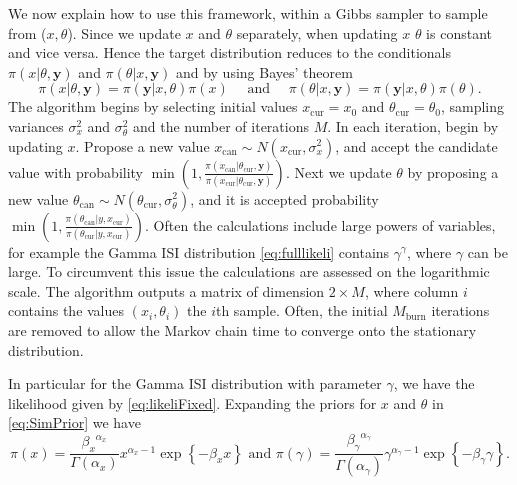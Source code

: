 \documentclass[../main.tex]{subfiles}
\begin{document}
 We now explain how to use this framework, within a Gibbs sampler to sample from ($x,\theta$). Since we update $x$ and $\theta$ separately, when updating $x$ $\theta$ is constant and vice versa. Hence the target distribution reduces to the conditionals $\pi(x | \theta, \mathbf{y})$ and $\pi(\theta | x, \mathbf{y})$  and by using Bayes' theorem
\begin{equation}
\pi(x | \theta, \mathbf{y}) = \pi(\mathbf{y}|x,\theta) \pi(x)   \quad \text{ and } \quad \pi(\theta | x, \mathbf{y}) = \pi(\mathbf{y}|x,\theta)
\pi(\theta). 
\end{equation}   
The algorithm begins by selecting initial values $x_{\mathrm{cur}} = x_0$ and $\theta_{\mathrm{cur}} = \theta_0$, sampling variances $\sigma^2_x$ and $\sigma^2_{\theta}$ and the number of iterations $M$. In each iteration, begin by updating $x$. Propose a new value $x_{\mathrm{can}} \sim N(x_{\mathrm{cur}}, \sigma^2_x)$, and accept the candidate value with probability $\min \left(1,\frac{\pi(x_{\mathrm{can}} |\theta_{\mathrm{cur}}, \mathbf{y})}{\pi(x_{\mathrm{cur}}|\theta_{\mathrm{cur}}, \mathbf{y})}\right)$. Next we update $\theta$ by proposing a new value $\theta_{\mathrm{can}} \sim N(\theta_{\mathrm{cur}}, \sigma^2_\theta)$, and it is accepted probability $\min \left(1,\frac{\pi(\theta_{\mathrm{can}} | y, x_{\mathrm{cur}})}{\pi(\theta_{\mathrm{cur}} | y, x_{\mathrm{cur}})}\right)$. Often the calculations include large powers of variables, for example the Gamma ISI distribution \eqref{eq:fulllikeli} contains $\gamma^\gamma$, where $\gamma$ can be large. To circumvent this issue the calculations are assessed on the logarithmic scale. The algorithm outputs a matrix of dimension $2 \times M$, where column $i$ contains the values $(x_i,\theta_i)$ the $i$th sample. Often, the initial $M_{\mathrm{burn}}$ iterations are removed to allow the Markov chain time to converge onto the stationary distribution.


In particular for the Gamma ISI distribution with parameter $\gamma$, we have the likelihood given by \eqref{eq:likeliFixed}. Expanding the priors for $x$ and $\theta$ in \eqref{eq:SimPrior} we have
\begin{equation}
\pi (x) = \frac{{\beta_x}^{\alpha_x}}{\Gamma \left( \alpha_x\right)} x^{\alpha_x - 1} \exp \left\{ - \beta_x x \right\} \text{  and  }
\pi(\gamma) = \frac{{\beta_\gamma}^{\alpha_\gamma}}{\Gamma \left( \alpha_\gamma\right)} \gamma^{\alpha_\gamma - 1} \exp \left\{ - \beta_\gamma \gamma \right\}.
\end{equation}
\end{document}
